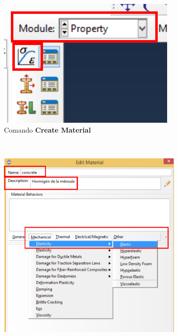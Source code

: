 \begin{enumerate}
\begin{figure}[H]
  \centering
  \begin{subfigure}{0.19\textwidth}
    \includegraphics[width=\textwidth]{./body/images/imagen13.pdf}
    \caption{Comando \textbf{Create Material}}
    \label{figu13}
  \end{subfigure}%
  ~ %
  \begin{subfigure}{0.39\textwidth}
    \includegraphics[width=\textwidth]{./body/images/imagen14.pdf}

\end{subfigure}
\end{figure}
\end{enumerate}
